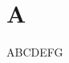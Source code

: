 \newpage
\section{A}
ABCDE\cite{Wallner2004Efficient}FG
\subsection{}

\subsection{}

\subsection{}

\subsection{}

